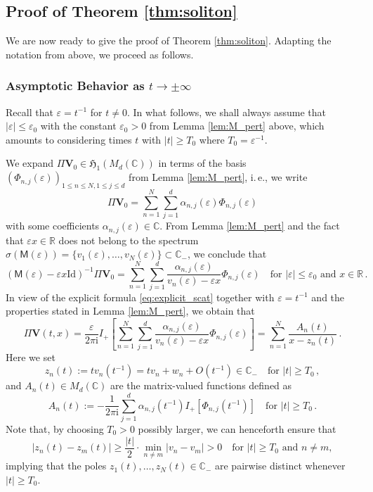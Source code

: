 \documentclass[11pt,reqno]{amsart}
\theoremstyle{definition}
\theoremstyle{remark}
\theoremstyle{remark}
\numberwithin{equation}{section}
\newcommand{\Hfr}{\mathfrak{H}}
\newcommand{\C}{\mathbb{C}}
\newcommand{\R}{\mathbb{R}}
\newcommand{\be}{\begin{equation}}
\newcommand{\ee}{\end{equation}}
\newcommand{\eps}{\varepsilon}
\newcommand{\Ms}{\mathsf{M}}
\newcommand{\ii}{\mathrm{i}}
\newcommand{\Vb}{\mathbf{V}}
\newcommand{\id}{\mathrm{Id}}
\begin{document}
\subsection*{Proof of Theorem \ref{thm:soliton}}

We are now ready to give the proof of Theorem \ref{thm:soliton}. Adapting the notation from above, we proceed as follows.

\subsubsection*{Asymptotic Behavior as $t \to \pm \infty$}

Recall that  $\eps = t^{-1}$ for $t \neq 0$. In what follows, we shall always assume that $|\eps| \leq \eps_0$ with the constant $\eps_0> 0$ from Lemma \ref{lem:M_pert} above, which amounts to considering times $t$ with $|t| \geq T_0$ where $T_0 = \eps^{-1}$. 

We expand $\Pi \Vb_0 \in \Hfr_1(M_d(\C))$ in terms of the basis $(\Phi_{n,j}(\eps))_{1 \leq n \leq N, 1 \leq j \leq d}$ from Lemma \ref{lem:M_pert}, i.\,e., we write
\be \label{eq:Vb0_expansion}
\Pi \Vb_0 = \sum_{n=1}^N \sum_{j=1}^d \alpha_{n,j}(\eps) \Phi_{n,j}(\eps) 
\ee 
with some coefficients $\alpha_{n,j}(\eps) \in \C$. From Lemma \ref{lem:M_pert} and the fact that $\eps x \in \R$ does not belong to the spectrum $\sigma(\Ms(\eps)) = \{ v_1(\eps), \ldots, v_N(\eps) \} \subset \C_-$, we conclude that
\be
(\Ms(\eps) - \eps x \id)^{-1} \Pi \Vb_0 = \sum_{n=1}^N \sum_{j=1}^d \frac{\alpha_{n,j}(\eps)}{v_n(\eps) - \eps x} \Phi_{n,j}(\eps) \quad \mbox{for $|\eps| \leq \eps_0$ and $x \in \R$} \, .
\ee
In view of the explicit formula \eqref{eq:explicit_scat} together with $\eps = t^{-1}$ and the properties stated in Lemma \ref{lem:M_pert}, we obtain that 
\be
\Pi \Vb(t,x) = \frac{\eps}{2 \pi \ii} I_+ \left [ \sum_{n=1}^N \sum_{j=1}^d \frac{\alpha_{n,j}(\eps)}{v_n(\eps) - \eps x} \Phi_{n,j}(\eps) \right ] = \sum_{n=1}^N \frac{A_n(t)}{x-z_n(t)} \, .
\ee
Here we set
\be
z_n(t) := t v_n(t^{-1}) = t v_n + w_n + O(t^{-1}) \in \C_- \quad \mbox{for $|t| \geq T_0$} \, ,
\ee
and $A_n(t) \in M_d(\C)$  are the matrix-valued functions defined as
\be \label{eq:An_expansion}
A_n(t) := - \frac{1}{2 \pi \ii} \sum_{j=1}^d \alpha_{n,j}(t^{-1}) I_+[\Phi_{n,j}(t^{-1})] \quad \mbox{for $|t| \geq T_0$} \, .
\ee 
Note that, by choosing $T_0 > 0$ possibly larger, we can henceforth ensure that 
\be \label{ineq:zn_zm} 
|z_n(t) - z_m(t)| \geq \frac{|t|}{2} \cdot \min_{n \neq m} |v_n - v_m|  > 0 \quad \mbox{for $|t| \geq T_0$ and $n \neq m$},
\ee
implying that the poles $z_1(t), \ldots, z_N(t) \in \C_-$ are pairwise distinct whenever $|t| \geq T_0$. 
\end{document}
